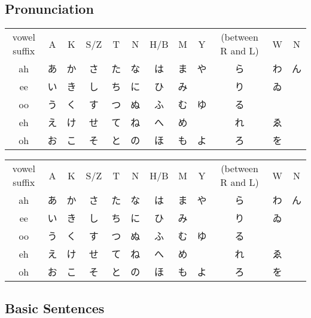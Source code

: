 \documentclass[12pt,landscape]{article}
\begin{document}
\raggedright
\footnotesize


\setlength{\premulticols}{0.5pt}
\setlength{\postmulticols}{0.5pt}
\setlength{\multicolsep}{0.5pt}
\setlength{\columnsep}{0.5pt}

\subsection{Pronunciation}
\begin{CJK}{UTF8}{min}
\begin{table}
\begin{tabular}{|c|c|c|c|c|c|c|c|c|c|c|c|} 
\toprule
\rowcolor{title}
vowel suffix & A & K & S/Z & T & N & H/B & M & Y & (between R and L) & W & N \\
ah & あ & か & さ & た & な & は & ま & や & ら & わ & ん \\
ee & い & き & し & ち & に & ひ & み &    & り & ゐ  & \\
oo & う & く & す & つ & ぬ & ふ & む & ゆ & る & & \\
eh & え & け & せ & て & ね & へ & め &    & れ & ゑ & \\
oh & お & こ & そ & と & の & ほ & も & よ & ろ & を & \\
\end{tabular}
\end{table}
\begin{tabular}{|c|c|c|c|c|c|c|c|c|c|c|c|} 
\toprule
\rowcolor{title}
vowel suffix & A & K & S/Z & T & N & H/B & M & Y & (between R and L) & W & N \\
ah & あ & か & さ & た & な & は & ま & や & ら & わ & ん \\
ee & い & き & し & ち & に & ひ & み &    & り & ゐ  & \\
oo & う & く & す & つ & ぬ & ふ & む & ゆ & る & & \\
eh & え & け & せ & て & ね & へ & め &    & れ & ゑ & \\
oh & お & こ & そ & と & の & ほ & も & よ & ろ & を & \\
\end{tabular}
\end{CJK}
\subsection{Basic Sentences}
\begin{tabular}{@{}llr@{}} 
\toprule
\end{tabular}

\scriptsize


\end{document}
